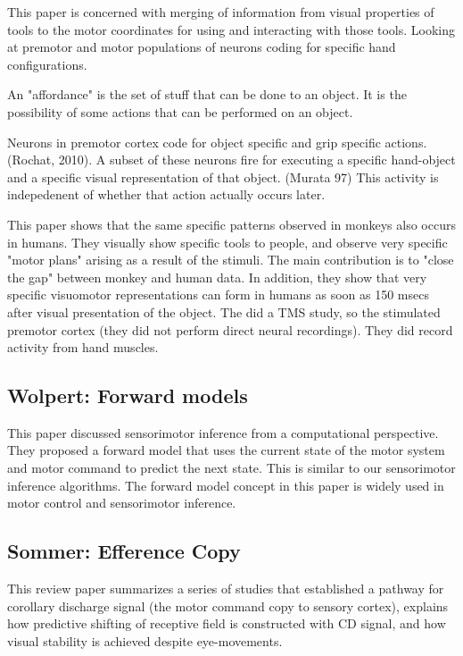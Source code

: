 \documentclass{article} %
\begin{document}
This paper \cite{Bartoli2014} is concerned with merging of information from
visual properties of tools to the motor coordinates for using and interacting
with those tools. Looking at premotor and motor populations of neurons coding
for specific hand configurations.

An "affordance" is the set of stuff that can be done to an object.  It is the
possibility of some actions that can be performed on an object.

Neurons in premotor cortex code for object specific and grip specific actions.
(Rochat, 2010). A subset of these neurons fire for executing a specific
hand-object and a specific visual representation of that object. (Murata 97)
This activity is indepedenent of whether that action actually occurs later.

This paper shows that the same specific patterns observed in monkeys also occurs
in humans.  They visually show specific tools to people, and observe very
specific "motor plans" arising as a result of the stimuli. The main contribution
is to "close the gap" between monkey and human data. In addition, they show that
very specific visuomotor representations can form in humans as soon as 150 msecs
after visual presentation of the object.  The did a TMS study, so the stimulated
premotor cortex (they did not perform direct neural recordings).  They did
record activity from hand muscles.

\subsection{Wolpert: Forward models}

This paper \cite{Wolpert1996} discussed sensorimotor inference from a
computational perspective. They proposed a forward model that uses the current
state of the motor system and motor command to predict the next state. This is
similar to our sensorimotor inference algorithms. The forward model concept in
this paper is widely used in motor control and sensorimotor inference.

\subsection{Sommer: Efference Copy}

This review paper \cite{Sommer2006} summarizes a series of studies that
established a  pathway for corollary discharge signal (the motor command copy to
sensory cortex), explains how predictive shifting of receptive field is
constructed with CD signal, and how visual stability is achieved despite
eye-movements.
\end{document}
